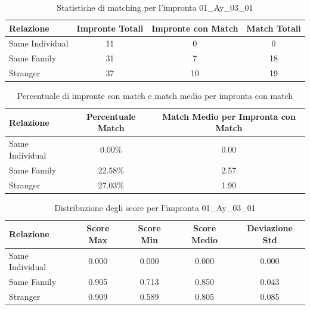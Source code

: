 \begin{table}[htbp]
\centering
\caption{Statistiche di matching per l'impronta 01\_Ay\_03\_01}
\label{tab:results_01_Ay_03_01}
\begin{tabular}{|l|c|c|c|}
\hline
\textbf{Relazione} & \textbf{Impronte Totali} & \textbf{Impronte con Match} & \textbf{Match Totali} \\
\hline
Same Individual & 11 & 0 & 0 \\
\hline
Same Family & 31 & 7 & 18 \\
\hline
Stranger & 37 & 10 & 19 \\
\hline
\end{tabular}
\end{table}


\begin{table}[htbp]
\centering
\caption{Percentuale di impronte con match e match medio per impronta con match}
\label{tab:match_percentage_01_Ay_03_01}
\begin{tabular}{|l|c|c|}
\hline
\textbf{Relazione} & \textbf{Percentuale Match} & \textbf{Match Medio per Impronta con Match} \\
\hline
Same Individual & 0.00\% & 0.00 \\
\hline
Same Family & 22.58\% & 2.57 \\
\hline
Stranger & 27.03\% & 1.90 \\
\hline
\end{tabular}
\end{table}


\begin{table}[htbp]
\centering
\caption{Distribuzione degli score per l'impronta 01\_Ay\_03\_01}
\label{tab:scores_01_Ay_03_01}
\begin{tabular}{|l|c|c|c|c|}
\hline
\textbf{Relazione} & \textbf{Score Max} & \textbf{Score Min} & \textbf{Score Medio} & \textbf{Deviazione Std} \\
\hline
Same Individual & 0.000 & 0.000 & 0.000 & 0.000 \\
\hline
Same Family & 0.905 & 0.713 & 0.850 & 0.043 \\
\hline
Stranger & 0.909 & 0.589 & 0.805 & 0.085 \\
\hline
\end{tabular}
\end{table}

